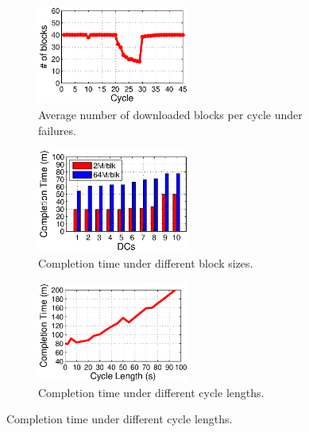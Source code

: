 \begin{figure}[t]
        \centering
        \begin{subfigure}[b]{0.3\textwidth}
                \centering
                \includegraphics[width=50mm]{images/failure_v2.eps}%
                \caption{Average number of downloaded blocks per cycle under failures.}
                \label{fig:analysis:failure}
        \end{subfigure}
        \begin{subfigure}[b]{0.3\textwidth}
                \centering
                \includegraphics[width=50mm]{images/blkSize_v2.eps} %
                \caption{Completion time under different block sizes.}
                \label{fig:analysis:blksize}
        \end{subfigure}
        \begin{subfigure}[b]{0.3\textwidth}
                \centering
                \includegraphics[width=50mm]{images/cycleDiff.eps}%
                \caption{Completion time under different cycle lengths.}
                \label{fig:analysis:cycleDiff}
        \end{subfigure}
        \label{fig:analysis}
\end{figure}


